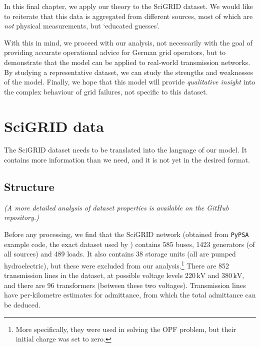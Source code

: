\documentclass[main.tex]{subfiles}
\begin{document}
In this final chapter, we apply our theory to the SciGRID dataset. We would like to reiterate that this data is aggregated from different sources, most of which are \emph{not} physical measurements, but `educated guesses'.

With this in mind, we proceed with our analysis, not necessarily with the goal of providing accurate operational advice for German grid operators, but to demonstrate that the model can be applied to real-world transmission networks. By studying a representative dataset, we can study the strengths and weaknesses of the model. Finally, we hope that this model will provide \emph{qualitative insight} into the complex behaviour of grid failures, not specific to this dataset.


\section{SciGRID data}
The SciGRID dataset needs to be translated into the language of our model. It contains more information than we need, and it is not yet in the desired format. 

\subsection{Structure}
\emph{(A more detailed analysis of dataset properties is available on the GitHub repository.)}

Before any processing, we find that the SciGRID network (obtained from \texttt{PyPSA} example code, the exact dataset used by \cite{Nesti2018emergentfailures}) contains 585 buses, 1423 generators (of all sources) and 489 loads. It also contains 38 storage units (all are pumped hydroelectric), but these were excluded from our analysis.\footnote{More specifically, they were used in solving the OPF problem, but their initial charge was set to zero.} There are 852 transmission lines in the dataset, at possible voltage levels $220 \, \si{\kilo\volt}$ and $380 \, \si{\kilo\volt}$, and there are 96 transformers (between these two voltages). Transmission lines have per-kilometre estimates for admittance, from which the total admittance can be deduced.
\end{document}
